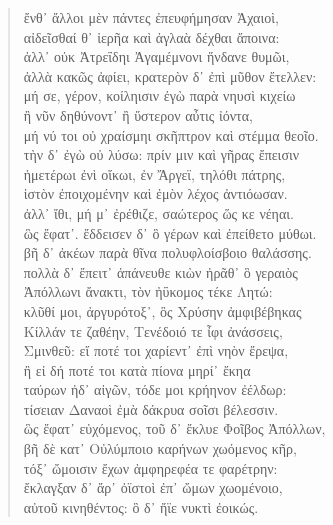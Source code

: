 \begin{Spacing}{1.5}
\begin{verse}
{\large\g  ἔνθ᾽ ἄλλοι μὲν πάντες ἐπευφήμησαν Ἀχαιοὶ,  } \\
{\large\g  αἰδεῖσθαί θ᾽ ἱερῆα καὶ ἀγλαὰ δέχθαι ἄποινα:  } \\
{\large\g  ἀλλ᾽ οὐκ Ἀτρεΐδηι Ἀγαμέμνονι ἥνδανε θυμῶι,  } \\
{\large\g  ἀλλὰ κακῶς ἀφίει, κρατερὸν δ᾽ ἐπὶ μῦθον ἔτελλεν:  } \\
{\large\g  μή σε, γέρον, κοίληισιν ἐγὼ παρὰ νηυσὶ κιχείω  } \\
{\large\g  ἢ νῦν δηθύνοντ᾽ ἢ ὕστερον αὖτις ἰόντα,  } \\
{\large\g  μή νύ τοι οὐ χραίσμηι σκῆπτρον καὶ στέμμα θεοῖο.  } \\
{\large\g  τὴν δ᾽ ἐγὼ οὐ λύσω: πρίν μιν καὶ γῆρας ἔπεισιν  } \\
{\large\g  ἡμετέρωι ἐνὶ οἴκωι, ἐν Ἄργεϊ, τηλόθι πάτρης,  } \\
{\large\g  ἱστὸν ἐποιχομένην καὶ ἐμὸν λέχος ἀντιόωσαν.  } \\
{\large\g  ἀλλ᾽ ἴθι, μή μ᾽ ἐρέθιζε, σαώτερος ὥς κε νέηαι.  } \\
{\large\g  ὣς ἔφατ᾽. ἔδδεισεν δ᾽ ὃ γέρων καὶ ἐπείθετο μύθωι.  } \\
{\large\g  βῆ δ᾽ ἀκέων παρὰ θῖνα πολυφλοίσβοιο θαλάσσης.  } \\
{\large\g  πολλὰ δ᾽ ἔπειτ᾽ ἀπάνευθε κιὼν ἠρᾶθ᾽ ὃ γεραιὸς  } \\
{\large\g  Ἀπόλλωνι ἄνακτι, τὸν ἠΰκομος τέκε Λητώ:  } \\
{\large\g  κλῦθί μοι, ἀργυρότοξ᾽, ὃς Χρύσην ἀμφιβέβηκας  } \\
{\large\g  Κίλλάν τε ζαθέην, Τενέδοιό τε ἶφι ἀνάσσεις,  } \\
{\large\g  Σμινθεῦ: εἴ ποτέ τοι χαρίεντ᾽ ἐπὶ νηὸν ἔρεψα,  } \\
{\large\g  ἢ εἰ δή ποτέ τοι κατὰ πίονα μηρί᾽ ἔκηα  } \\
{\large\g  ταύρων ἠδ᾽ αἰγῶν, τόδε μοι κρήηνον ἐέλδωρ:  } \\
{\large\g  τίσειαν Δαναοὶ ἐμὰ δάκρυα σοῖσι βέλεσσιν.  } \\
{\large\g  ὣς ἔφατ᾽ εὐχόμενος, τοῦ δ᾽ ἔκλυε Φοῖβος Ἀπόλλων,  } \\
{\large\g  βῆ δὲ κατ᾽ Οὐλύμποιο καρήνων χωόμενος κῆρ,  } \\
{\large\g  τόξ᾽ ὤμοισιν ἔχων ἀμφηρεφέα τε φαρέτρην:  } \\
{\large\g  ἔκλαγξαν δ᾽ ἄρ᾽ ὀϊστοὶ ἐπ᾽ ὤμων χωομένοιο,  } \\
{\large\g  αὐτοῦ κινηθέντος: ὃ δ᾽ ἤϊε νυκτὶ ἐοικώς.  } \\

\end{verse}
\end{Spacing}
